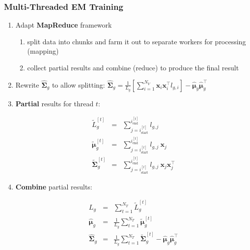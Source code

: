 \documentclass[usenames,dvipsnames]{beamer}
\def\Vec#1{{\boldsymbol{#1}}}
\def\Mat#1{{\boldsymbol{#1}}}
\begin{document}
%
%
%

\begin{frame}
\frametitle{Multi-Threaded EM Training}

\begin{enumerate}[{~~$\boldsymbol{\bullet}$}]

\item Adapt {\bf MapReduce} framework

\begin{enumerate}[{$\boldsymbol{\rightarrow}$}]
\renewcommand{\itemsep}{1ex}
\item split data into chunks and farm it out to separate workers for processing (mapping)
\item collect partial results and combine (reduce) to produce the final result
\end{enumerate}
\vspace{1ex}

\item
Rewrite $\widehat{\Mat{\Sigma}}_g$ to allow splitting:
{$\widehat{\Mat{\Sigma}}_g = \frac{1}{L_g} \left[ \sum\nolimits_{i=1}^{N_V} \Vec{x}_i \Vec{x}_i^\top l_{g,i} \right] - \widehat{\Vec{\mu}}_g \widehat{\Vec{\mu}}_g^\top$}
\vspace{1ex}

\item {\bf Partial} results for thread $t$:
%
\vspace{-2ex}
\begin{footnotesize}%
\begin{eqnarray*}
  \widetilde{L}_g^{[t]}            & = & \sum\nolimits_{j = i^{[t]}_{\textrm{start}}}^{i^{[t]}_{\textrm{end}}} l_{g,j}                             \\
  \widetilde{\Vec{\mu}}_g^{[t]}    & = & \sum\nolimits_{j = i^{[t]}_{\textrm{start}}}^{i^{[t]}_{\textrm{end}}} l_{g,j} ~ \Vec{x}_j                 \\
  \widetilde{\Mat{\Sigma}}_g^{[t]} & = & \sum\nolimits_{j = i^{[t]}_{\textrm{start}}}^{i^{[t]}_{\textrm{end}}} l_{g,j} ~ \Vec{x}_j \Vec{x}_j^\top
\end{eqnarray*}%
\end{footnotesize}

\item {\bf Combine} partial results:
%
\begin{footnotesize}%
\vspace{-2ex}
\begin{eqnarray*}
  L_g                      & = & \sum\nolimits_{t=1}^{N_T} \widetilde{L}_g^{[t]} \\
  \widehat{\Vec{\mu}}_g    & = & \frac{1}{L_g} \sum\nolimits_{t=1}^{N_T} \widetilde{\Vec{\mu}}_g^{[t]} \\
  \widehat{\Mat{\Sigma}}_g & = & \frac{1}{L_g} \sum\nolimits_{t=1}^{N_T} \widetilde{\Mat{\Sigma}}_g^{[t]} - \widehat{\Vec{\mu}}_g \widehat{\Vec{\mu}}_g^\top
\end{eqnarray*}%
\end{footnotesize}



\end{enumerate}
\end{frame}
\end{document}
